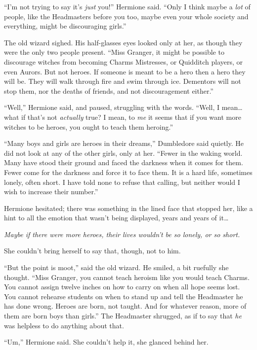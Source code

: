 ``I'm not trying to say it's \emph{just} you!'' Hermione said. ``Only I
think maybe a \emph{lot} of people, like the Headmasters before you too,
maybe even your whole society and everything, might be discouraging
girls.''

The old wizard sighed. His half-glasses eyes looked only at her, as
though they were the only two people present. ``Miss Granger, it might
be possible to discourage witches from becoming Charms Mistresses, or
Quidditch players, or even Aurors. But not heroes. If someone is meant
to be a hero then a hero they will be. They will walk through fire and
swim through ice. Dementors will not stop them, nor the deaths of
friends, and not discouragement either.''

``Well,'' Hermione said, and paused, struggling with the words. ``Well,
I mean\ldots{} what if that's not \emph{actually} true? I mean, to
\emph{me} it seems that if you want more witches to be heroes, you ought
to teach them heroing.''

``Many boys and girls are heroes in their dreams,'' Dumbledore said
quietly. He did not look at any of the other girls, only at her. ``Fewer
in the waking world. Many have stood their ground and faced the darkness
when it comes for them. Fewer come for the darkness and force it to face
them. It is a hard life, sometimes lonely, often short. I have told none
to refuse that calling, but neither would I wish to increase their
number.''

Hermione hesitated; there was something in the lined face that stopped
her, like a hint to all the emotion that wasn't being displayed, years
and years of it\ldots{}

\emph{Maybe if there were more heroes, their lives wouldn't be so
lonely, or so short.}

She couldn't bring herself to say that, though, not to him.

``But the point is moot,'' said the old wizard. He smiled, a bit
ruefully she thought. ``Miss Granger, you cannot teach heroism like you
would teach Charms. You cannot assign twelve inches on how to carry on
when all hope seems lost. You cannot rehearse students on when to stand
up and tell the Headmaster he has done wrong. Heroes are born, not
taught. And for whatever reason, more of them are born boys than
girls.'' The Headmaster shrugged, as if to say that \emph{he} was
helpless to do anything about that.

``Um,'' Hermione said. She couldn't help it, she glanced behind her.

